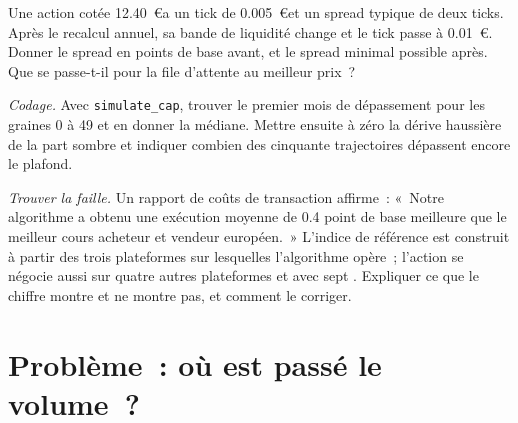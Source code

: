 \begin{exercise}[$\star\star$]\label{exo:m1:european-equity-market-structure:6}
Une action cotée 12.40~\euro a un tick de 0.005~\euro et un spread typique de deux
ticks. Après le recalcul annuel, sa bande de liquidité change et le tick
passe à 0.01~\euro. Donner le spread en points de base avant, et le spread minimal
possible après. Que se passe-t-il pour la file d'attente au meilleur prix~?
\end{exercise}

\begin{exercise}[$\star\star\star$]\label{exo:m1:european-equity-market-structure:7}
\emph{Codage.} Avec \texttt{simulate\_cap}, trouver le premier mois de dépassement pour
les graines 0 à 49 et en donner la médiane. Mettre ensuite à zéro la dérive haussière de la
part sombre et indiquer combien des cinquante trajectoires dépassent encore le plafond.
\end{exercise}

\begin{exercise}[$\star\star\star$]\label{exo:m1:european-equity-market-structure:8}
\emph{Trouver la faille.} Un rapport de coûts de transaction affirme~: «~Notre algorithme
a obtenu une exécution moyenne de 0.4 point de base meilleure que le meilleur cours
acheteur et vendeur européen.~» L'indice de référence est construit à partir des trois plateformes sur lesquelles
l'algorithme opère~; l'action se négocie aussi sur quatre autres plateformes et avec sept
. Expliquer ce que le chiffre montre et ne montre pas, et
comment le corriger.
\end{exercise}

\section{Problème~: où est passé le volume~?}

